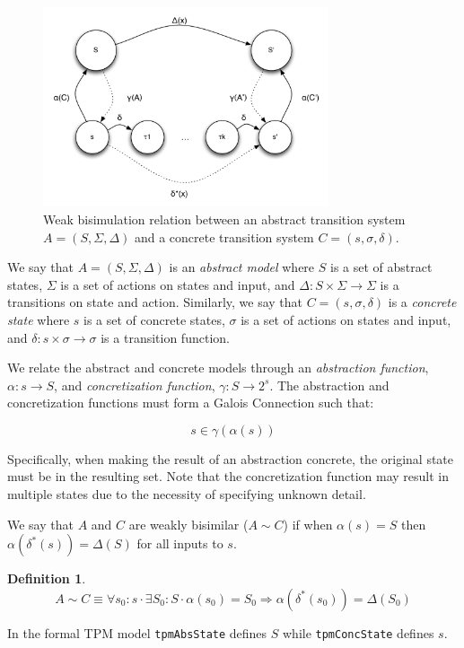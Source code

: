 \documentclass[10pt]{article}
\newtheorem{definition}{Definition}
\begin{document}
\begin{figure}[hbtp]
  \centering
  \includegraphics[width=0.75\textwidth]{figures/bisimulation.pdf}
  \caption{Weak bisimulation relation between an abstract transition
    system $A=(S,\Sigma,\Delta)$ and a concrete transition system
    $C=(s,\sigma,\delta)$.}
  \label{fig:bisimulation} 
\end{figure}

We say that $A=(S,\Sigma,\Delta)$ is an \emph{abstract model} where
$S$ is a set of abstract states, $\Sigma$ is a set of actions on
states and input, and $\Delta : S\times\Sigma\rightarrow\Sigma$ is a
transitions on state and action.  Similarly, we say that
$C=(s,\sigma,\delta)$ is a \emph{concrete state } where $s$ is a set
of concrete states, $\sigma$ is a set of actions on states and input,
and $\delta : s\times\sigma\rightarrow\sigma$ is a transition
function.

We relate the abstract and concrete models through an \emph{abstraction
function}, $\alpha:s\rightarrow S$, and \emph{concretization
function}, $\gamma:S\rightarrow 2^s$.  The abstraction and
concretization functions must form a Galois Connection such that:

\[s\in\gamma(\alpha(s))\]

\noindent Specifically, when making the result of an abstraction
concrete, the original state must be in the resulting set.  Note that
the concretization function may result in multiple states due to the
necessity of specifying unknown detail.

We say that $A$ and $C$ are weakly bisimilar ($A\sim C$) if when
$\alpha(s)=S$ then $\alpha(\delta^*(s))=\Delta(S)$ for all inputs to
$s$.

\begin{definition} 
  \[A\sim C \equiv \forall s_0:s \cdot \exists S_0:S \cdot
  \alpha(s_0)=S_0 \Rightarrow \alpha(\delta^*(s_0))=\Delta(S_0)\]
  \label{def:bisimulation}
\end{definition}

In the formal TPM model \texttt{tpmAbsState} defines $S$ while
\texttt{tpmConcState} defines $s$.

\appendix





\end{document}
